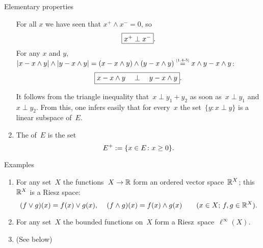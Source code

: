 \documentclass[main.tex]{subfiles}
\begin{document}
\begin{psec}{Elementary properties}
\begin{enumerate}
For all $x$ we have seen that $x^+\wedge x^- = 0$,
so
\begin{equation*}
\fbox{$ x^+ \perp x^- $}
\textnormal{.}
\end{equation*}
For any $x$ and $y$, 
$|x-x\wedge y|\wedge|y-x\wedge y|
=(x-x\wedge y) \wedge (y-x\wedge y)
\isref{1.4-5} x\wedge y - x\wedge y$:
\begin{equation*}
\fbox{$ x-x\wedge y \quad \perp \quad y- x\wedge y $}
\textnormal{.}
\end{equation*}

It follows from the triangle inequality
 that~$x\perp y_1 + y_2$
as soon as~$x\perp y_1$ and $x\perp y_2$.
From this,
one infers easily that for every~$x$
the set~$\{ y: x\perp y\}$
is a linear subspace of~$E$.
%
\item \label{1.14-12}
The  of~$E$ is the set
\begin{equation*}
E^+ := \{x\in E\colon x\ge 0\}
\textnormal{.}
\end{equation*}
\end{enumerate}
\end{psec}
%
%
%
%
\begin{psec}{Examples}
\label{1.5}
\begin{enumerate}
\item
\label{1.5-1}
For any set~$X$
the functions~$X\rightarrow \mathbb{R}$
form an ordered vector space~$\mathbb{R}^X$;
this~$\mathbb{R}^X$ is a Riesz space:
\begin{equation*}
(f\vee g)(x) = f(x)\vee g(x)\textnormal{, } \quad 
(f\wedge g)(x) = f(x)\wedge g(x)\qquad
(x\in X\textnormal{; }f,g\in\mathbb{R}^X)
\textnormal{.}
\end{equation*}
%
\item
\label{1.5-2}
For any set~$X$ the bounded functions on~$X$ form a 
Riesz~space~$\ell^\infty(X)$.
%
\setcounter{list-1.5}{\value{enumi}}
\item
(See below)
\end{enumerate}
\end{psec}
%
%
\end{document}
